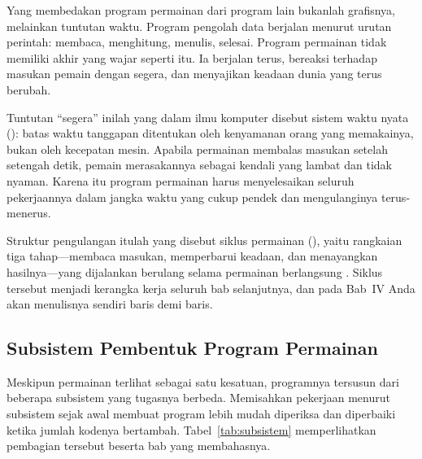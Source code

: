 Yang membedakan program permainan dari program lain bukanlah grafisnya,
melainkan tuntutan waktu. Program pengolah data berjalan menurut urutan
perintah: membaca, menghitung, menulis, selesai. Program permainan tidak
memiliki akhir yang wajar seperti itu. Ia berjalan terus, bereaksi terhadap
masukan pemain dengan segera, dan menyajikan keadaan dunia yang terus berubah.

Tuntutan ``segera'' inilah yang dalam ilmu komputer disebut sistem waktu
nyata (): batas waktu tanggapan ditentukan oleh
kenyamanan orang yang memakainya, bukan oleh kecepatan mesin. Apabila
permainan membalas masukan setelah setengah detik, pemain merasakannya sebagai
kendali yang lambat dan tidak nyaman. Karena itu program permainan harus
menyelesaikan seluruh pekerjaannya dalam jangka waktu yang cukup pendek dan
mengulanginya terus-menerus.

Struktur pengulangan itulah yang disebut siklus permainan
(), yaitu rangkaian tiga tahap---membaca masukan,
memperbarui keadaan, dan menayangkan hasilnya---yang dijalankan berulang
selama permainan berlangsung \cite{nystrom-gameloop}. Siklus tersebut menjadi
kerangka kerja seluruh bab selanjutnya, dan pada Bab~IV Anda akan menulisnya
sendiri baris demi baris.

\subsection{Subsistem Pembentuk Program Permainan}

Meskipun permainan terlihat sebagai satu kesatuan, programnya tersusun dari
beberapa subsistem yang tugasnya berbeda. Memisahkan pekerjaan menurut
subsistem sejak awal membuat program lebih mudah diperiksa dan diperbaiki
ketika jumlah kodenya bertambah. Tabel~\ref{tab:subsistem} memperlihatkan
pembagian tersebut beserta bab yang membahasnya.

